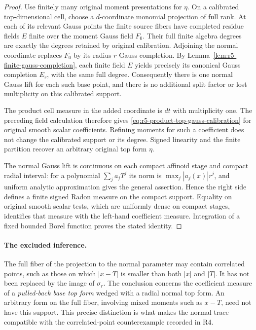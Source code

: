\documentclass[11pt,a4paper]{article}
\numberwithin{equation}{section}
\theoremstyle{definition}
\theoremstyle{remark}
\begin{document}
\begin{proof}
Use finitely many original moment presentations for $\eta$.
On a calibrated top-dimensional cell, choose a $d$-coordinate
monomial projection of full rank.  At each of its relevant
Gauss points the finite source fibers have completed residue
fields $E$ finite over the moment Gauss field $F_0$.  Their
full finite algebra degrees are exactly the degrees retained
by original calibration.  Adjoining the normal coordinate
replaces $F_0$ by its radius-$r$ Gauss completion.  By
Lemma~\ref{lem:r5-finite-gauss-completion}, each finite field
$E$ yields precisely its canonical Gauss completion $E_r$,
with the same full degree.  Consequently there is one normal
Gauss lift for each such base point, and there is no additional
split factor or lost multiplicity on this calibrated support.

The product cell measure in the added coordinate is $dt$ with
multiplicity one.  The preceding field calculation therefore
gives \eqref{eq:r5-product-top-gauss-calibration} for original
smooth scalar coefficients.  Refining moments for such a
coefficient does not change the calibrated support or its
degree.  Signed linearity and the finite partition recover an
arbitrary original top form $\eta$.

The normal Gauss lift is continuous on each compact affinoid
stage and compact radial interval: for a polynomial
$\sum_j a_jT^j$ its norm is $\max_j|a_j(x)|r^j$, and uniform
analytic approximation gives the general assertion.  Hence
the right side defines a finite signed Radon measure on the
compact support.  Equality on original smooth scalar tests,
which are uniformly dense on compact stages, identifies that
measure with the left-hand coefficient measure.  Integration
of a fixed bounded Borel function proves the stated identity.
\end{proof}

\paragraph{The excluded inference.}
The full fiber of the projection to the normal parameter may
contain correlated points, such as those on which $|x-T|$ is
smaller than both $|x|$ and $|T|$.  It has not been replaced
by the image of $\sigma_r$.  The conclusion concerns the
coefficient measure of a \emph{pulled-back base top form}
wedged with a radial normal top form.  An arbitrary form on
the full fiber, involving mixed moments such as $x-T$, need
not have this support.  This precise distinction is what
makes the normal trace compatible with the correlated-point
counterexample recorded in R4.
\end{document}
